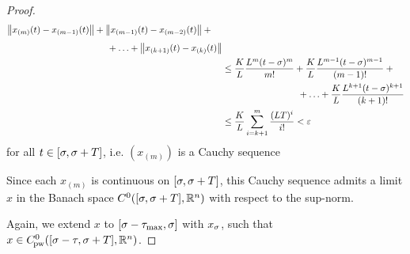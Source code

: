 \begin{proof}
\begin{align*}
\begin{multlined}[t][0.55\displaywidth]
                \nnorm*{x_{(m)}(t)-x_{(m-1)}(t)} + \nnorm*{x_{(m-1)}(t)-x_{(m-2)}(t)} + {}\\[0.5em]
                +\ldots+\nnorm*{x_{(k+1)}(t)-x_{(k)}(t)}
            \end{multlined}\\
            &\leq \!\begin{multlined}[t][0.6\displaywidth]
                \frac{K}{L}\frac{L^m (t-\tzero)^m}{m!} + \frac{K}{L}\frac{L^{m-1} (t-\tzero)^{m-1}}{(m-1)!} + {}\\
                +\ldots+\frac{K}{L}\frac{L^{k+1} (t-\tzero)^{k+1}}{(k+1)!}
            \end{multlined}\\
            &\leq \frac{K}{L}\sum_{i=k+1}^m \frac{(LT)^i}{i!} < \varepsilon
        \end{align*}
        for all $t\in [\sigma,\sigma+T]$, i.e. $(x_{(m)})$ is a Cauchy sequence

    

        Since each $x_{(m)}$ is continuous on $[\sigma,\sigma+T]$, this Cauchy sequence admits a limit $x$ in the Banach space $\Cn[0]{\compactum{\tzero}{\tzero+T}}{\R^n}$ with respect to the sup-norm.

        Again, we extend $x$ to $[\sigma-\tau_{\max},\sigma]$ with $x_\sigma$, such that $x\in\Cnpw[0]{\compactum{\tzero-\tau}{\tzero+T}}{\R^n}$.


\end{proof}
